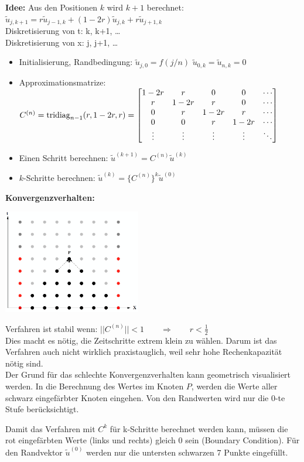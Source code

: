 \textbf{Idee:} Aus den Positionen $k$ wird $k+1$ berechnet: $\tilde{u}_{j,k+1} = r \tilde{u}_{j-1,k} + (1-2r)\tilde{u}_{j,k} + r \tilde{u}_{j+1,k}$\\
Diskretisierung von t: k, k+1, \ldots\\
Diskretisierung von x: j, j+1, \ldots\\

\begin{itemize}
\item Initialisierung, Randbedingung: $\tilde{u}_{j,0}=f(j/n)$ \qquad $\tilde{u}_{0,k}=\tilde{u}_{n,k}=0$
\item Approximationsmatrize: $C^{(n)}=\operatorname{tridiag}_{n-1}(r,1-2r,r)=\begin{bmatrix}
1-2r& r		& 0		& 0 	&\cdots\\
r	& 1-2r  & r		& 0		&\cdots\\
0	& r		& 1-2r 	& r 	&\cdots\\
0	& 0		& r		& 1-2r 	&\cdots\\
\vdots&	\vdots&\vdots&\vdots&\ddots	
\end{bmatrix}$ 
\item Einen Schritt berechnen: $\tilde{u}^{(k+1)}=C^{(n)} \tilde{u}^{(k)}$
\item $k$-Schritte berechnen: $\tilde{u}^{(k)}=\big\{C^{(n)}\big\}^k \tilde{u}^{(0)}$
\end{itemize}

\textbf{Konvergenzverhalten:} \\

\begin{minipage}{6cm}
\includegraphics[width=6cm]{Content/Numerik/KonvExplizit.png}
\end{minipage}
\hfill
\begin{minipage}{12cm}
Verfahren ist stabil wenn: $||C^{(n)}|| < 1 \qquad \Rightarrow\qquad r < \frac{1}{2}$\\

Dies macht es nötig, die Zeitschritte extrem klein zu wählen. Darum ist das Verfahren auch nicht wirklich praxistauglich, weil sehr hohe Rechenkapazität nötig sind.\\

Der Grund für das schlechte Konvergenzverhalten kann geometrisch visualisiert werden. In die Berechnung des Wertes im Knoten $P$, werden die Werte aller schwarz eingefärbter Knoten eingehen. Von den Randwerten wird nur die 0-te Stufe berücksichtigt.
\end{minipage}
Damit das Verfahren mit $C^k$ für k-Schritte berechnet werden kann, müssen die
rot eingefärbten Werte (links und rechts) gleich 0 sein (Boundary Condition).
Für den Randvektor $\tilde{u}^{(0)}$ werden nur die untersten schwarzen 7 Punkte
eingefüllt.

